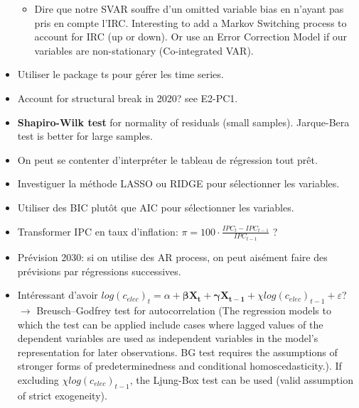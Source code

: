 \begin{itemize}
\begin{itemize}
    \item Dire que notre SVAR souffre d'un omitted variable bias en n'ayant pas pris en compte l'IRC. Interesting to add a Markov Switching process to account for IRC (up or down). Or use an Error Correction Model if our variables are non-stationary (Co-integrated VAR).
\end{itemize}
\item Utiliser le package ts pour gérer les time series.
\item Account for structural break in 2020? see E2-PC1.
\item \textbf{Shapiro-Wilk test} for normality of residuals (small samples). Jarque-Bera test is better for large samples. 
\item On peut se contenter d'interpréter le tableau de régression tout prêt.
\item Investiguer la méthode LASSO ou RIDGE pour sélectionner les variables. 
\item Utiliser des BIC plutôt que AIC pour sélectionner les variables.
\item Transformer IPC en taux d'inflation: $\pi = 100 \cdot \frac{IPC_t - IPC_{t-1}}{IPC_{t-1}}$ ?
\item Prévision 2030: si on utilise des AR process, on peut aisément faire des prévisions par régressions successives.
\item Intéressant d'avoir $log(c_{elec})_t = \alpha + \boldsymbol{\beta X_t} + \boldsymbol{\gamma X_{t-1}} + {\chi log(c_{elec})_{t-1}} + \varepsilon$? $\to$ Breusch–Godfrey test for autocorrelation (The regression models to which the test can be applied include cases where lagged values of the dependent variables are used as independent variables in the model's representation for later observations. BG test requires the assumptions of stronger forms of predeterminedness and conditional homoscedasticity.). If excluding $\chi log(c_{elec})_{t-1}$, the Ljung-Box test can be used (valid assumption of strict exogeneity).
\end{itemize}

